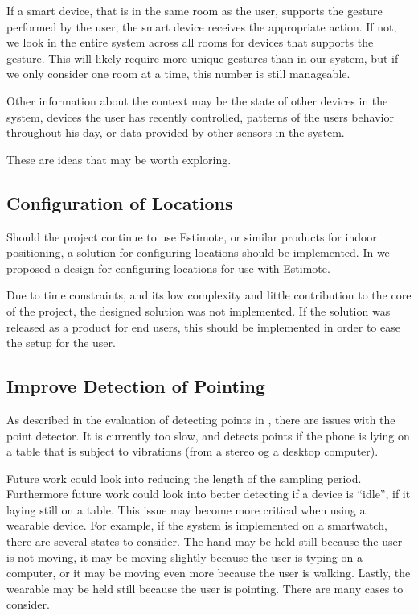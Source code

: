 If a smart device, that is in the same room as the user, 
supports the gesture performed by the user, 
the smart device receives the appropriate action. 
If not, we look in the entire system across all rooms for devices that supports the gesture.
This will likely require more unique gestures than in our system,
but if we only consider one room at a time, 
this number is still manageable.

Other information about the context may be the state of other devices in the system, 
devices the user has recently controlled, 
patterns of the users behavior throughout his day, 
or data provided by other sensors in the system.

These are ideas that may be worth exploring. 

\subsection{Configuration of Locations}

Should the project continue to use Estimote, 
or similar products for indoor positioning, 
a solution for configuring locations should be implemented. 
In  we proposed a design for configuring locations for use with Estimote. 

Due to time constraints, 
and its low complexity and little contribution to the core of the project, 
the designed solution was not implemented. 
If the solution was released as a product for end users, 
this should be implemented in order to ease the setup for the user.

\subsection{Improve Detection of Pointing}

As described in the evaluation of detecting points in , 
there are issues with the point detector. 
It is currently too slow, 
and detects points if the phone is lying on a table that is subject to vibrations (from \eg a stereo og a desktop computer).

Future work could look into reducing the length of the sampling period. 
Furthermore future work could look into better detecting if a device is ``idle'', 
\ie if it laying still on \eg a table. 
This issue may become more critical when using a wearable device. 
For example, if the system is implemented on a smartwatch, 
there are several states to consider. 
The hand may be held still because the user is not moving, 
it may be moving slightly because the user is typing on a computer, 
or it may be moving even more because the user is walking. 
Lastly, the wearable may be held still because the user is pointing. 
There are many cases to consider.

